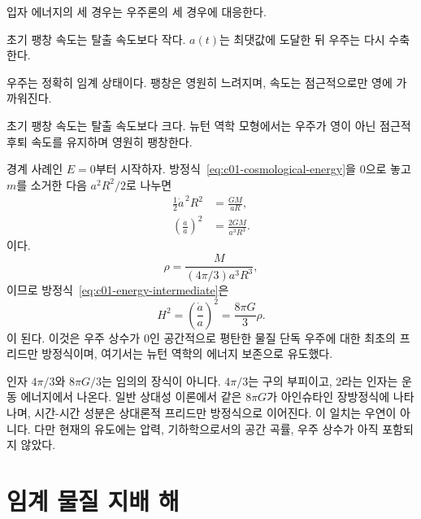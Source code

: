 입자 에너지의 세 경우는 우주론의 세 경우에 대응한다.
\begin{description}[style=nextline]
\item[\(E<0\):] 초기 팽창 속도는 탈출 속도보다 작다. \(a(t)\)는 최댓값에 도달한 뒤 우주는 다시 수축한다.
\item[\(E=0\):] 우주는 정확히 임계 상태이다. 팽창은 영원히 느려지며, 속도는 점근적으로만 영에 가까워진다.
\item[\(E>0\):] 초기 팽창 속도는 탈출 속도보다 크다. 뉴턴 역학 모형에서는 우주가 영이 아닌 점근적 후퇴 속도를 유지하며 영원히 팽창한다.
\end{description}

경계 사례인 \(E=0\)부터 시작하자. 방정식~\eqref{eq:c01-cosmological-energy}을 0으로 놓고 \(m\)를 소거한 다음 \(a^2R^2/2\)로 나누면 \begin{align}
\frac12\dot a^{\,2}R^2&=\frac{GM}{aR}, \\
\left(\frac{\dot a}{a}\right)^2&=\frac{2GM}{a^3R^3}.
\label{eq:c01-energy-intermediate}
\end{align}이다. \begin{equation}
\rho=\frac{M}{(4\pi/3)a^3R^3},
\end{equation}이므로 방정식~\eqref{eq:c01-energy-intermediate}은 \begin{equation}
\boxed{
H^2=\left(\frac{\dot a}{a}\right)^2=\frac{8\pi G}{3}\rho.
}
\label{eq:c01-first-friedmann}
\end{equation}이 된다. 이것은 우주 상수가 0인 공간적으로 평탄한 물질 단독 우주에 대한 최초의 프리드만 방정식이며, 여기서는 뉴턴 역학의 에너지 보존으로 유도했다.

\begin{classroomqa}\end{classroomqa}

인자 \(4\pi/3\)와 \(8\pi G/3\)는 임의의 장식이 아니다. \(4\pi/3\)는 구의 부피이고, 2라는 인자는 운동 에너지에서 나온다. 일반 상대성 이론에서 같은 \(8\pi G\)가 아인슈타인 장방정식에 나타나며, 시간-시간 성분은 상대론적 프리드만 방정식으로 이어진다. 이 일치는 우연이 아니다. 다만 현재의 유도에는 압력, 기하학으로서의 공간 곡률, 우주 상수가 아직 포함되지 않았다.

\section{임계 물질 지배 해}

